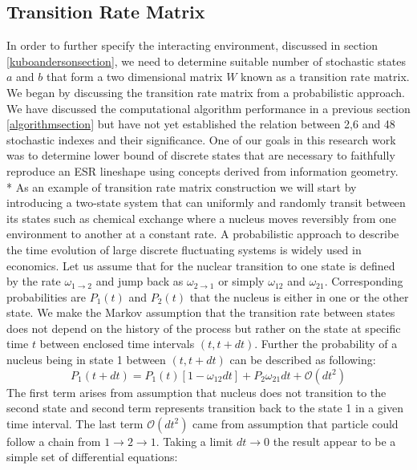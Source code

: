 \subsection{Transition Rate Matrix}\label{trmsection}
In order to further specify the interacting environment, discussed in section \ref{kuboandersonsection}, we need to determine suitable number of stochastic states $a$ and $b$ that form a two dimensional matrix $W$ known as a transition rate matrix. We began by discussing the transition rate matrix from a probabilistic approach. We have discussed the computational algorithm performance in a previous section \ref{algorithmsection} but have not yet established the relation between 2,6 and 48 stochastic indexes and their significance. One of our goals in this research work was to determine lower bound of discrete states that are necessary to faithfully reproduce an ESR lineshape using concepts derived from information geometry\cite{Earle2009}.\\*
As an example of transition rate matrix construction we will start by introducing a two-state system that can uniformly and randomly transit between its states such as chemical exchange where a nucleus moves reversibly from one environment to another at a constant rate. A probabilistic approach to describe the time evolution of large discrete fluctuating systems is widely used in economics\cite{Weidlich1992}. Let us assume that for the nuclear transition to one state is defined by the rate $\omega_{1\rightarrow2}$ and jump back as $\omega_{2\rightarrow1}$ or simply $\omega_{12}$ and $\omega_{21}$. Corresponding probabilities are $P_{1}(t)$ and $P_{2}(t)$ that the nucleus is either in one or the other state. We make the Markov assumption that the transition rate between states does not depend on the history of the process but rather on the state at specific time $t$ between enclosed time intervals $(t,t+dt)$. Further the probability of a nucleus being in state 1 between $(t,t+dt)$ can be described as following: 
\begin{equation}\label{eq:premaster}
P_{1}(t+dt)=P_{1}(t)[1-\omega_{12}dt]+P_{2}\omega_{21}dt+\mathcal{O}(dt^2)
\end{equation} 
The first term arises from assumption that nucleus does not transition to the second state and second term represents transition back to the state 1 in a given time interval. The last term $\mathcal{O}(dt^2)$ came from assumption that particle could follow a chain from $1\rightarrow 2 \rightarrow 1$. Taking a limit $dt\rightarrow 0$ the result appear to be a simple set of differential equations: 
